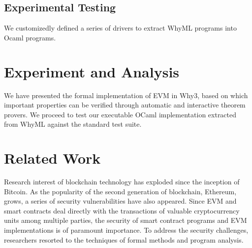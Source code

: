\documentclass[runningheads]{llncs}
\begin{document}
\subsection{Experimental Testing}
We customizedly defined a series of drivers to extract WhyML programs into Ocaml programs. 


\section{Experiment and Analysis}\label{Sec: Experiment}
We have presented the formal implementation of EVM in Why3, based on which important properties can be verified through automatic and interactive theorem provers. We proceed to test our executable OCaml implementation extracted from WhyML against the standard test suite. 

\section{Related Work}\label{Sec: Related}
Research interest of blockchain technology has exploded since the inception  of Bitcoin. As the popularity of the second generation of blockchain, Ethereum, grows, a series of security vulnerabilities have also appeared. Since EVM and smart contracts deal directly with the transactions of valuable cryptocurrency units among multiple parties, the security of smart contract programs and EVM implementations is of paramount importance. To address the security challenges, researchers resorted to the techniques of formal methods and program analysis. 
\end{document}
